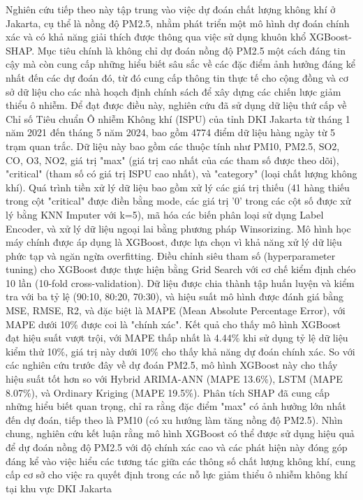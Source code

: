 Nghiên cứu tiếp theo này \cite{article_tab_1} tập trung vào việc dự đoán chất lượng không khí ở Jakarta, cụ thể là nồng độ PM2.5, nhằm phát triển một mô hình dự đoán chính xác và có khả năng giải thích được thông qua việc sử dụng khuôn khổ XGBoost-SHAP. Mục tiêu chính là không chỉ dự đoán nồng độ PM2.5 một cách đáng tin cậy mà còn cung cấp những hiểu biết sâu sắc về các đặc điểm ảnh hưởng đáng kể nhất đến các dự đoán đó, từ đó cung cấp thông tin thực tế cho cộng đồng và cơ sở dữ liệu cho các nhà hoạch định chính sách để xây dựng các chiến lược giảm thiểu ô nhiễm. Để đạt được điều này, nghiên cứu đã sử dụng dữ liệu thứ cấp về Chỉ số Tiêu chuẩn Ô nhiễm Không khí (ISPU) của tỉnh DKI Jakarta từ tháng 1 năm 2021 đến tháng 5 năm 2024, bao gồm 4774 điểm dữ liệu hàng ngày từ 5 trạm quan trắc. Dữ liệu này bao gồm các thuộc tính như PM10, PM2.5, SO2, CO, O3, NO2, giá trị "max" (giá trị cao nhất của các tham số được theo dõi), "critical" (tham số có giá trị ISPU cao nhất), và "category" (loại chất lượng không khí). Quá trình tiền xử lý dữ liệu bao gồm xử lý các giá trị thiếu (41 hàng thiếu trong cột "critical" được điền bằng mode, các giá trị '0' trong các cột số được xử lý bằng KNN Imputer với k=5), mã hóa các biến phân loại sử dụng Label Encoder, và xử lý dữ liệu ngoại lai bằng phương pháp Winsorizing. Mô hình học máy chính được áp dụng là XGBoost, được lựa chọn vì khả năng xử lý dữ liệu phức tạp và ngăn ngừa overfitting. Điều chỉnh siêu tham số (hyperparameter tuning) cho XGBoost được thực hiện bằng Grid Search với cơ chế kiểm định chéo 10 lần (10-fold cross-validation). Dữ liệu được chia thành tập huấn luyện và kiểm tra với ba tỷ lệ (90:10, 80:20, 70:30), và hiệu suất mô hình được đánh giá bằng MSE, RMSE, R2, và đặc biệt là MAPE (Mean Absolute Percentage Error), với MAPE dưới 10\% được coi là "chính xác". Kết quả cho thấy mô hình XGBoost đạt hiệu suất vượt trội, với MAPE thấp nhất là 4.44\% khi sử dụng tỷ lệ dữ liệu kiểm thử 10\%, giá trị này dưới 10\% cho thấy khả năng dự đoán chính xác. So với các nghiên cứu trước đây về dự đoán PM2.5, mô hình XGBoost này cho thấy hiệu suất tốt hơn so với Hybrid ARIMA-ANN (MAPE 13.6\%), LSTM (MAPE 8.07\%), và Ordinary Kriging (MAPE 19.5\%). Phân tích SHAP đã cung cấp những hiểu biết quan trọng, chỉ ra rằng đặc điểm "max" có ảnh hưởng lớn nhất đến dự đoán, tiếp theo là PM10 (có xu hướng làm tăng nồng độ PM2.5). Nhìn chung, nghiên cứu kết luận rằng mô hình XGBoost có thể được sử dụng hiệu quả để dự đoán nồng độ PM2.5 với độ chính xác cao và các phát hiện này đóng góp đáng kể vào việc hiểu các tương tác giữa các thông số chất lượng không khí, cung cấp cơ sở cho việc ra quyết định trong các nỗ lực giảm thiểu ô nhiễm không khí tại khu vực DKI Jakarta

